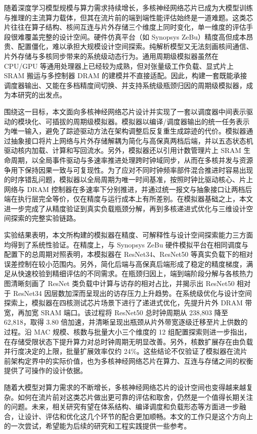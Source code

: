 


随着深度学习模型规模与算力需求持续增长，多核神经网络芯片已成为大模型训练与推理的主流算力载体，但其在流片前的端到端性能评估始终是一道难题。这类芯片往往在算子结构、核间互连与片外存储三个维度上同时变化，单一维度的评估手段很难覆盖完整的设计空间。硬件仿真平台（如 Synopsys ZeBu）精度高但成本昂贵、配置僵化，难以承担大规模设计空间探索。纯解析模型又无法刻画核间通信、片外存储与多核同步带来的系统级动态行为。通用周期级模拟器虽然在 CPU/GPU 等通用处理器上已经较为成熟，但对张量级工作负载、显式片上 SRAM 搬运与多控制器 DRAM 的建模并不直接适配。因此，构建一套既能承接调度器输出、又能在多档精度间切换、并支持系统级瓶颈归因的周期级模拟器，成为本研究的出发点。

围绕这一目标，本文面向多核神经网络芯片设计并实现了一套以调度器中间表示驱动的模块化、可插拔的周期级模拟器。模拟器以编译/调度器输出的统一任务表示为唯一输入，避免了踪迹驱动方法在架构调整后反复重生成踪迹的代价。模拟器通过抽象接口将片上网络与片外存储解耦为简化与高保真两档后端，并以五态状态机驱动核内加载、计算和写回流水。另外，模拟器还以引用计数管理片上 SRAM 生命周期，以全局事件驱动与多速率推进处理跨时钟域同步，从而在多核并发与资源争用下保持因果一致与可复现性。为了应对不同时钟频率部件混合推进时容易出现的时序错乱问题，模拟器以全局周期为唯一时间基准，按照时钟比驱动核心、片上网络与 DRAM 控制器在多速率下分别推进，并通过统一报文与抽象接口让两档后端在执行层完全等价，仅在精度与运行成本上有所差别。在模拟器基础之上，本文进一步完成了从精度验证到真实负载瓶颈分解，再到多核递进式优化与三维设计空间探索的完整实验链路。

实验结果表明，本文所构建的模拟器在精度、可解释性与设计空间探索能力三方面均得到了系统性验证。在精度上，与 Synopsys ZeBu 硬件模拟平台在相同调度与配置下的总周期对照表明，本模拟器在 ResNet34、ResNet50 等真实负载下的相对误差控制在较小范围内。另外，简化后端与高保真后端形成了稳定的精度梯度，满足从快速校验到精细评估的不同需求。在瓶颈归因上，端到端阶段分解与各核热力图清晰刻画了 ResNet 类负载中计算与访存的相对占比，并揭示出 ResNet50 相对于 ResNet34 因层数加深而呈现出的访存压力上升趋势。在系统级优化与设计空间探索上，模拟器在四核测试芯片场景下进行了递进式优化，先提升片外 DRAM 带宽，再加宽 SRAM 端口。该过程将 ResNet50 总时钟周期从 238,803 降至 62,818，取得 3.80 倍加速，并清晰呈现出瓶颈从片外带宽逐级迁移至片上供数的过程。沿 MAC 规模、核数与批量大小三个维度的 12 组配置探索则进一步指出，在存储受限状态下提升算力对总时钟周期无明显改善。另外，核数扩展存在由负载并行度决定的上限，批量扩展效率仅约 24\%。这些结论不仅验证了模拟器在流片前架构定界中的实际价值，也为多核神经网络芯片在算力、互连与存储之间的权衡提供了可操作的设计依据。


随着大模型对算力需求的不断增长，多核神经网络芯片的设计空间也变得越来越复杂。如何在流片前对这类芯片做出更可靠的评估和取舍，仍然是一个值得长期关注的问题。未来，相关研究有望在体系结构、编译调度和负载形态等方面进一步融合，让设计、评估和优化这几个环节的配合更加顺畅。本文的工作只是这个方向上的一次尝试，希望能为后续的研究和工程实践提供一些参考。
